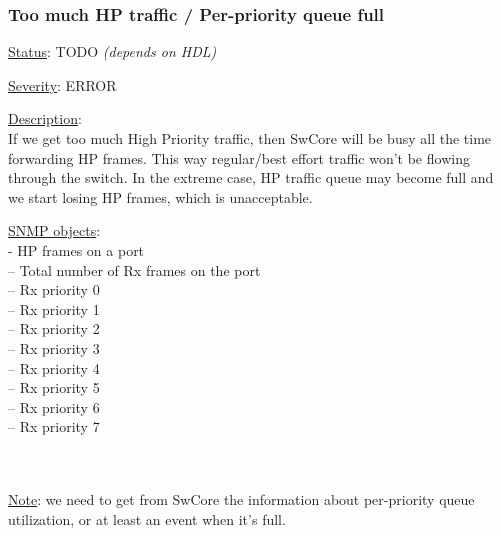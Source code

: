 \subsubsection{\bf Too much HP traffic / Per-priority queue full}
		\label{fail:data:too_much_HP}
		\begin{pck_descr}
			\item [] \underline{Status}: TODO \emph{(depends on HDL)}
			\item [] \underline{Severity}: ERROR
			\item [] \underline{Description}:\\
				If we get too much High Priority traffic, then SwCore will be busy all
				the time forwarding HP frames. This way regular/best effort traffic
				won't be flowing through the switch. In the extreme case, HP traffic
				queue may become full and we start losing HP frames, which is
				unacceptable.
			\item [] \underline{SNMP objects}:\\
				 - HP frames on a port\\
				 -- Total number of Rx frames on
				the port\\
				 -- Rx priority 0\\
				 -- Rx priority 1\\
				 -- Rx priority 2\\
				 -- Rx priority 3\\
				 -- Rx priority 4\\
				 -- Rx priority 5\\
				 -- Rx priority 6\\
				 -- Rx priority 7\\
				\\
				\\
			\item [] \underline{Note}: we need to get from SwCore the information
				about per-priority queue utilization, or at least an event when it's
				full.
		\end{pck_descr}


